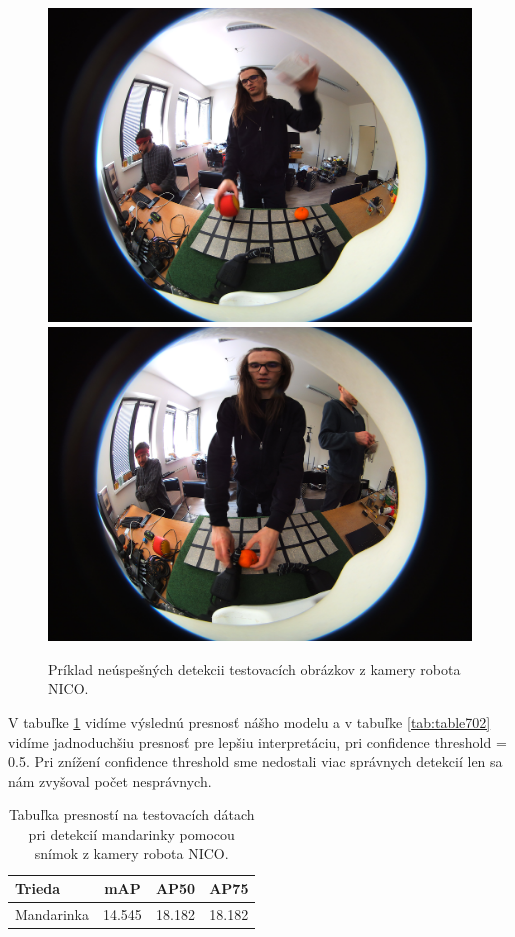 \begin{figure}[H]
\includegraphics[width=\textwidth]{images/2023-04-17-140935_8.jpg}
\includegraphics[width=\textwidth]{images/2023-04-17-140334_38.jpg}
\centering
\caption{Príklad neúspešných detekcii testovacích obrázkov z kamery robota NICO.}
\label{fig:image702}
\end{figure}

V tabuľke \ref{tab:table700} vidíme výslednú presnosť nášho modelu a v tabuľke \ref{tab:table702} vidíme jadnoduchšiu presnosť pre lepšiu interpretáciu, pri confidence threshold = 0.5. Pri znížení confidence threshold sme nedostali viac správnych detekcií len sa nám zvyšoval počet nesprávnych. 

\begin{table}[H]
\begin{tabular}{|l|c|c|c|}
\hline
\textbf{Trieda} & \textbf{mAP} & \textbf{AP50} & \textbf{AP75} \\
\hline
Mandarinka & 14.545 & 18.182 & 18.182 \\
\hline
\end{tabular}
\centering
\caption{Tabuľka presností na testovacích dátach pri detekcií mandarinky pomocou snímok z kamery robota NICO.}
\label{tab:table700}
\end{table}

